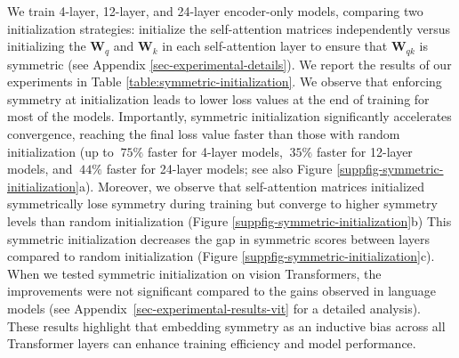 We train 4-layer, 12-layer, and 24-layer encoder-only models, comparing two initialization strategies: initialize the self-attention matrices independently versus initializing the $\bm{W}_q$ and $\bm{W}_k$ in each self-attention layer to ensure that $\bm{W}_{qk}$ is symmetric (see Appendix \ref{sec-experimental-details}).
%
We report the results of our experiments in Table \ref{table:symmetric-initialization}.
%
We observe that enforcing symmetry at initialization leads to lower loss values at the end of training for most of the models.
%
Importantly, symmetric initialization significantly accelerates convergence, reaching the final loss value faster than those with random initialization (up to $~75\%$ faster for 4-layer models,  $~35\%$ faster for 12-layer models, and $~44\%$ faster for 24-layer models; see also Figure \ref{suppfig-symmetric-initialization}a).
%
Moreover, we observe that self-attention matrices initialized symmetrically lose symmetry during training but converge to higher symmetry levels than random initialization (Figure \ref{suppfig-symmetric-initialization}b)
%
This symmetric initialization decreases the gap in symmetric scores between layers compared to random initialization (Figure \ref{suppfig-symmetric-initialization}c).
%
When we tested symmetric initialization on vision Transformers, the improvements were not significant compared to the gains observed in language models (see Appendix~\ref{sec-experimental-results-vit} for a detailed analysis).
%
%
These results highlight that embedding symmetry as an inductive bias across all Transformer layers can enhance training efficiency and model performance.
%
